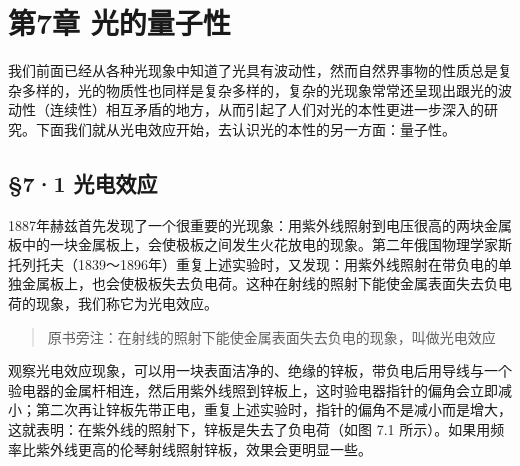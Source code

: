 \chapter{第7章
光的量子性}

我们前面已经从各种光现象中知道了光具有波动性，然而自然界事物的性质总是复杂多样的，光的物质性也同样是复杂多样的，复杂的光现象常常还呈现出跟光的波动性（连续性）相互矛盾的地方，从而引起了人们对光的本性更进一步深入的研究。下面我们就从光电效应开始，去认识光的本性的另一方面：量子性。

\section{§7·1 光电效应}

1887年赫兹首先发现了一个很重要的光现象：用紫外线照射到电压很高的两块金属板中的一块金属板上，会使极板之间发生火花放电的现象。第二年俄国物理学家斯托列托夫（1839～1896年）重复上述实验时，又发现：用紫外线照射在带负电的单独金属板上，也会使极板失去负电荷。这种在射线的照射下能使金属表面失去负电荷的现象，我们称它为光电效应。

\begin{quote}
原书旁注：在射线的照射下能使金属表面失去负电的现象，叫做光电效应
\end{quote}

观察光电效应现象，可以用一块表面洁净的、绝缘的锌板，带负电后用导线与一个验电器的金属杆相连，然后用紫外线照到锌板上，这时验电器指针的偏角会立即减小；第二次再让锌板先带正电，重复上述实验时，指针的偏角不是减小而是增大，这就表明：在紫外线的照射下，锌板是失去了负电荷（如图
7.1 所示）。如果用频率比紫外线更高的伦琴射线照射锌板，效果会更明显一些。

